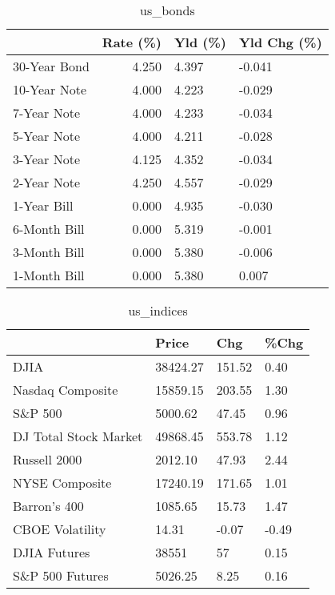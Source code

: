 \documentclass{article}%
\begin{document}
%


\begin{table}[htbp]%
\caption{us\_bonds}%
\centering%
\begin{adjustbox}{width=1\textwidth}%
\begin{tabular}{lrll}
\toprule
             &  Rate (\%) & Yld (\%) & Yld Chg (\%) \\
\midrule
30-Year Bond &     4.250 &   4.397 &      -0.041 \\
10-Year Note &     4.000 &   4.223 &      -0.029 \\
 7-Year Note &     4.000 &   4.233 &      -0.034 \\
 5-Year Note &     4.000 &   4.211 &      -0.028 \\
 3-Year Note &     4.125 &   4.352 &      -0.034 \\
 2-Year Note &     4.250 &   4.557 &      -0.029 \\
 1-Year Bill &     0.000 &   4.935 &      -0.030 \\
6-Month Bill &     0.000 &   5.319 &      -0.001 \\
3-Month Bill &     0.000 &   5.380 &      -0.006 \\
1-Month Bill &     0.000 &   5.380 &       0.007 \\
\bottomrule
\end{tabular}
%
\end{adjustbox}%
\end{table}

%


\begin{table}[htbp]%
\caption{us\_indices}%
\centering%
\begin{adjustbox}{width=1\textwidth}%
\begin{tabular}{llll}
\toprule
                      &    Price &    Chg &  \%Chg \\
\midrule
                 DJIA & 38424.27 & 151.52 &  0.40 \\
     Nasdaq Composite & 15859.15 & 203.55 &  1.30 \\
              S\&P 500 &  5000.62 &  47.45 &  0.96 \\
DJ Total Stock Market & 49868.45 & 553.78 &  1.12 \\
         Russell 2000 &  2012.10 &  47.93 &  2.44 \\
       NYSE Composite & 17240.19 & 171.65 &  1.01 \\
         Barron's 400 &  1085.65 &  15.73 &  1.47 \\
      CBOE Volatility &    14.31 &  -0.07 & -0.49 \\
         DJIA Futures &    38551 &     57 &  0.15 \\
      S\&P 500 Futures &  5026.25 &   8.25 &  0.16 \\
\bottomrule
\end{tabular}
%
\end{adjustbox}%
\end{table}
\end{document}
